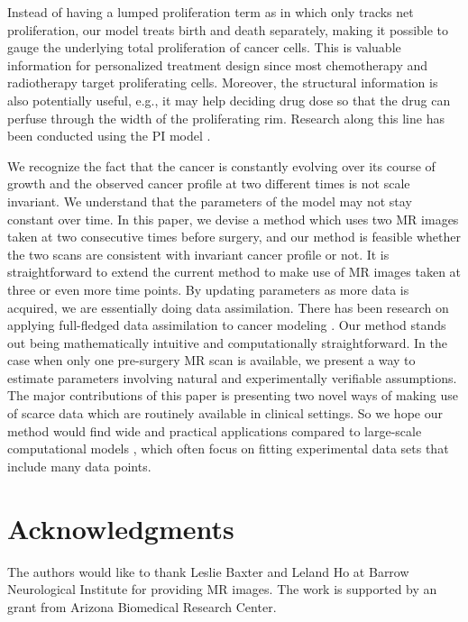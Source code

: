 \documentclass{aims}
\numberwithin{equation}{section}
\begin{document}
Instead of having a lumped proliferation term as in \cite{Jackson2015a}
which only tracks net proliferation, our model treats birth and death
separately, making it possible to gauge the underlying total proliferation
of cancer cells. This is valuable information for personalized treatment
design since most chemotherapy and radiotherapy target proliferating
cells. Moreover, the structural information is also potentially useful,
e.g., it may help deciding drug dose so that the drug can perfuse through
the width of the proliferating rim. Research along this line has been
conducted using the PI model \cite{Kim2017}. 

We recognize the fact that the cancer is constantly evolving over its course
of growth and the observed cancer profile at two different times is
not scale invariant. We understand that the parameters of the model may
not stay constant over time. In this paper, we devise a method which uses
two MR images taken at two consecutive times before surgery, and our
method is feasible whether the two scans are consistent with invariant
cancer profile or not. It is straightforward to extend the current
method to make use of MR images taken at three or even more time points.
By updating parameters as more data is acquired, we are essentially
doing data assimilation. There has been research on applying full-fledged
data assimilation to cancer modeling \cite{Kostelich2011,McDaniel2013}.
Our method stands out being mathematically intuitive and computationally 
straightforward. In the case when only one pre-surgery MR scan is available, we 
present a way to estimate parameters involving natural and experimentally verifiable
assumptions. The major contributions of this paper is presenting two novel ways
of making use of scarce data which are routinely available in clinical
settings. So we hope our method would find wide and practical applications
compared to large-scale computational models \cite{Eikenberry2009,Rutter2017},
which often focus on fitting experimental data sets that include many data points. 



\section*{Acknowledgments}
The authors would like to thank Leslie Baxter and Leland Ho at Barrow
Neurological Institute for providing MR images. The work is supported
by an grant from Arizona Biomedical Research Center. \\
\end{document}
